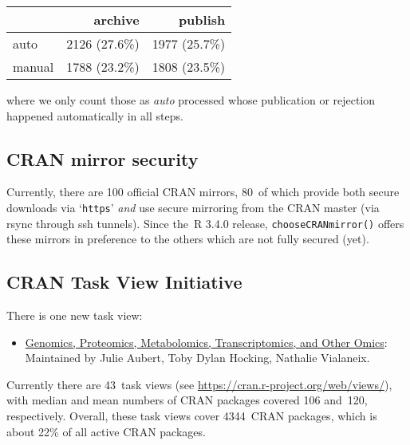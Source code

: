 \begin{longtable}[]{@{}lrr@{}}
\toprule\noalign{}
& archive & publish \\
\midrule\noalign{}
\endhead
\bottomrule\noalign{}
\endlastfoot
auto & 2126 (27.6\%) & 1977 (25.7\%) \\
manual & 1788 (23.2\%) & 1808 (23.5\%) \\
\end{longtable}

\noindent where we only count those as \emph{auto} processed whose publication or
rejection happened automatically in all steps.

\subsection{CRAN mirror security}\label{cran-mirror-security}

Currently, there are 100 official CRAN mirrors,
80~of which provide both
secure downloads via `\texttt{https}' \emph{and} use secure mirroring from the CRAN master
(via rsync through ssh tunnels). Since the~R 3.4.0 release, \texttt{chooseCRANmirror()}
offers these mirrors in preference to the others which are not fully secured (yet).

\subsection{CRAN Task View Initiative}\label{cran-task-view-initiative}

There is one new task view:

\begin{itemize}
\tightlist
\item
  \href{https://CRAN.R-project.org/view=Omics}{Genomics, Proteomics, Metabolomics, Transcriptomics, and Other Omics}: Maintained by Julie Aubert, Toby Dylan Hocking, Nathalie Vialaneix.
\end{itemize}

Currently there are 43~task views (see \url{https://cran.r-project.org/web/views/}),
with median and mean numbers of CRAN packages covered
106 and~120, respectively.
Overall, these task views cover 4344~CRAN packages,
which is about 22\% of all active CRAN packages.


\address{%
Kurt Hornik\\
WU Wirtschaftsuniversität Wien\\%
Austria\\
%
%
\textit{ORCiD: \href{https://orcid.org/0000-0003-4198-9911}{0000-0003-4198-9911}}\\%
\href{mailto:Kurt.Hornik@R-project.org}{\nolinkurl{Kurt.Hornik@R-project.org}}%
}

